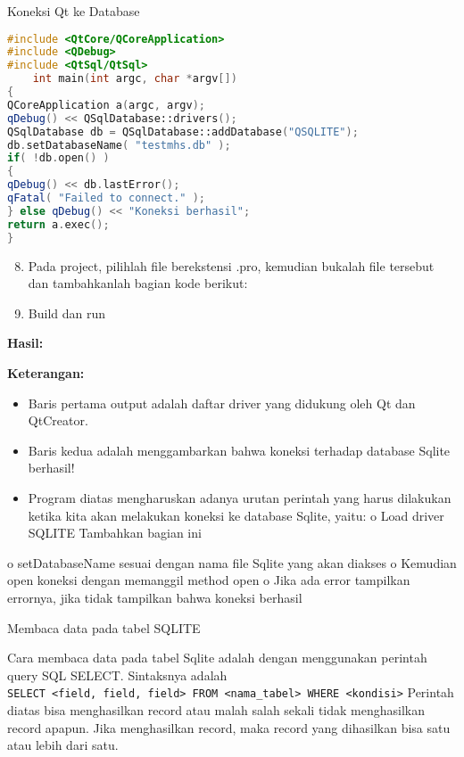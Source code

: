 Koneksi Qt ke Database

\begin{lstlisting}[language=c++, caption=Percobaan koneksi SQLite dengan QtConsole]
#include <QtCore/QCoreApplication>
#include <QDebug>
#include <QtSql/QtSql>
    int main(int argc, char *argv[])
{
QCoreApplication a(argc, argv);
qDebug() << QSqlDatabase::drivers();
QSqlDatabase db = QSqlDatabase::addDatabase("QSQLITE");
db.setDatabaseName( "testmhs.db" );
if( !db.open() )
{
qDebug() << db.lastError();
qFatal( "Failed to connect." );
} else qDebug() << "Koneksi berhasil";
return a.exec();
}
\end{lstlisting}

\begin{enumerate}

\setcounter{enumi}{7}
\item
  Pada project, pilihlah file berekstensi .pro, kemudian bukalah file
  tersebut dan tambahkanlah bagian kode berikut:
\item
  Build dan run
\end{enumerate}

\textbf{Hasil:}

\textbf{Keterangan:}

\begin{itemize}

\item
  Baris pertama output adalah daftar driver yang didukung oleh Qt dan
  QtCreator.
\item
  Baris kedua adalah menggambarkan bahwa koneksi terhadap database
  Sqlite berhasil!
\item
  Program diatas mengharuskan adanya urutan perintah yang harus
  dilakukan ketika kita akan melakukan koneksi ke database Sqlite,
  yaitu: o Load driver SQLITE Tambahkan bagian ini
\end{itemize}

o setDatabaseName sesuai dengan nama file Sqlite yang akan diakses o
Kemudian open koneksi dengan memanggil method open o Jika ada error
tampilkan errornya, jika tidak tampilkan bahwa koneksi berhasil

Membaca data pada tabel SQLITE

Cara membaca data pada tabel Sqlite adalah dengan menggunakan perintah
query SQL SELECT. Sintaksnya adalah
\texttt{SELECT\ \textless{}field,\ field,\ field\textgreater{}\ FROM\ \textless{}nama\_tabel\textgreater{}\ WHERE\ \textless{}kondisi\textgreater{}}
Perintah diatas bisa menghasilkan record atau malah salah sekali tidak
menghasilkan record apapun. Jika menghasilkan record, maka record yang
dihasilkan bisa satu atau lebih dari satu.

